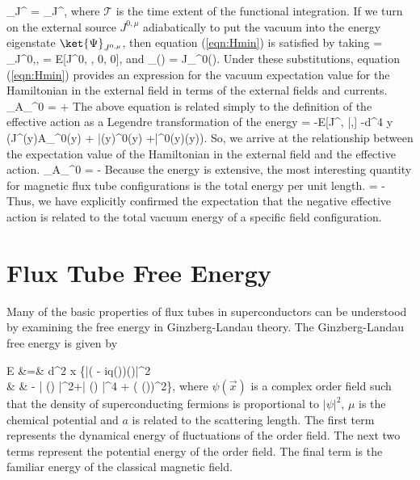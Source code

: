 \be
	\ket{\Psi}_{J^\mu} = \ket{\Psi}_{J^\mu},
\ee
where $\mathcal{T}$ is the time extent of the functional integration.
If we turn on the external source $J^{0,\mu}$ adiabatically to put the vacuum into the 
energy eigenstate $\ket{\Psi}_{J^{0,\mu}}$, then equation (\ref{eqn:Hmin}) is satisfied by 
taking 
\be
	\ket{\Omega} = \ket{\Psi}_{J^{0,\mu}},
\ee
\be
	\alpha = E[J^{0, \mu}, 0, 0],
\ee
and
\be
	\beta_\mu() = J_\mu^0().
\ee
Under these substitutions, equation (\ref{eqn:Hmin}) provides an expression for the 
vacuum expectation value for the Hamiltonian in the external field in terms of the 
external fields and currents.
\be
	_{A_\mu^0} =  + 
\ee
The above equation is related simply to the definition of the effective action 
as a Legendre transformation of the energy
\be
	\tag{\ref{eqn:LegendreTrans}}
	 = -E[J^\mu, \bar{\eta},\eta]
	-\int d^4 y (J^\mu(y)A_\mu^0(y) + \bar{\eta}(y)\psi^0(y) +\bar{\psi}^0(y)\eta(y)).
\ee
So, we arrive at the relationship between the expectation value of the 
Hamiltonian in the external field and the effective action.
\be
	_{A_\mu^0} = - \Gamma[A_\mu^0]
\ee
Because the energy is extensive, the most interesting quantity for magnetic 
flux tube configurations is the total energy per unit length.
\be
	 = -
\ee
Thus, we have explicitly confirmed the expectation that the negative effective 
action is related to the total vacuum energy of a specific field configuration.

\section{Flux Tube Free Energy}

Many of the basic properties of flux tubes in superconductors can 
be understood by examining the free energy in Ginzberg-Landau theory.
The Ginzberg-Landau free energy is given by


\ba
	\label{eqn:GLFE}
	E &=& \int d^2 x \biggr\{\biggr|\left(\vec{\nabla }
		- iq()\right)\psi()\biggr|^2 \nonumber \\
	 & & - \mu | \psi() |^2+| \psi() |^4 
	 + (\vec{\nabla} \times {} ())^2\biggr\},	
\ea
where $\psi(\vec{x})$ is a complex order field such that the 
density of superconducting fermions is proportional to $|\psi|^2$, $\mu$ 
is the chemical potential and $a$ is related to the scattering length. 
The first term represents the dynamical energy of fluctuations of the 
order field. The next two terms represent the potential energy 
of the order field. The final term is the familiar energy of the 
classical magnetic field.

